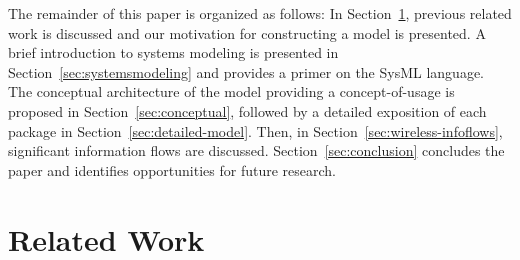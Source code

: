 \documentclass[journal, twoside]{IEEEtran}
\begin{document}
The remainder of this paper is organized as follows:  In Section~\ref{sec:related-work}, previous related work is discussed and our motivation for constructing a model is presented.  A brief introduction to systems modeling is presented in Section~\ref{sec:systemsmodeling} and provides a primer on the SysML language. The conceptual architecture of the model providing a concept-of-usage is proposed in Section~\ref{sec:conceptual}, followed by a detailed exposition of each package in Section~\ref{sec:detailed-model}.  Then, in Section~\ref{sec:wireless-infoflows}, significant information flows are discussed. Section~\ref{sec:conclusion} concludes the paper and identifies opportunities for future research.
	
	\section{Related Work}\label{sec:related-work}

    
\end{document}
